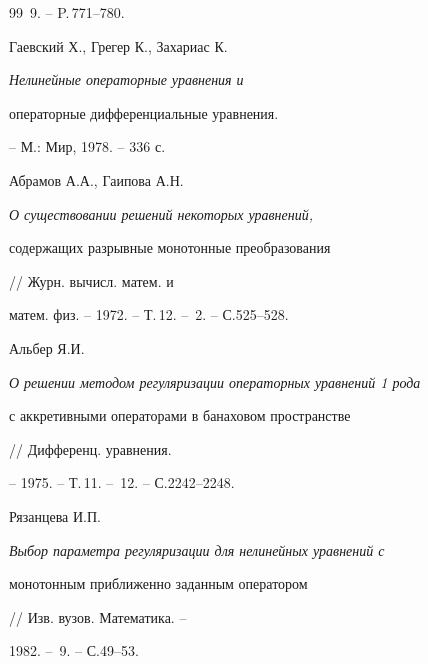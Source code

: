 \begin{thebibliography}{99}
\No\,9. -- P.\,771--780. 


 




Гаевский Х., Грегер К., Захариас К. {\em Нелинейные операторные уравнения и 


операторные дифференциальные уравнения.} -- М.: Мир, 1978. -- 336 с. 


 




Абрамов А.А., Гаипова А.Н. {\em О существовании решений некоторых уравнений, 


содержащих разрывные монотонные преобразования} // Журн. вычисл. матем. и 


матем. физ. -- 1972. -- Т.\,12. -- \No\,2. -- С.525--528. 


 




Альбер Я.И. {\em О решении методом регуляризации операторных уравнений 1 рода 


с аккретивными операторами в банаховом пространстве} // Дифференц. уравнения. 


-- 1975. -- Т.\,11. -- \No\,12. -- С.2242--2248. 


 




Рязанцева И.П. {\em Выбор параметра регуляризации для нелинейных уравнений с 


монотонным приближенно заданным оператором} // Изв. вузов. Математика. -- 


1982. -- \No\,9. -- С.49--53. 


 


\end{thebibliography} 


 


\vskip 2cm 


 






 


 


